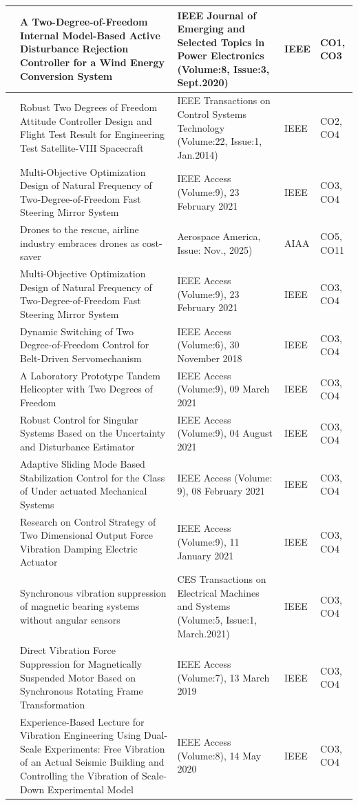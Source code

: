 \documentclass[11pt,paper=a4,answers]{exam}
\begin{document}
\begin{flushleft}
\begin{longtable}{|>{\centering\arraybackslash}p{1.4cm}  |  >{\raggedright\arraybackslash}p{6cm} |>{\centering\arraybackslash}p{3.75cm}|>{\centering\arraybackslash}p{2cm} |>{\centering\arraybackslash}p{2cm} |}
25&A Two-Degree-of-Freedom Internal Model-Based Active Disturbance Rejection Controller for a Wind Energy Conversion System&IEEE Journal of Emerging and Selected Topics in Power Electronics (Volume:8, Issue:3, Sept.2020)&IEEE&CO1, CO3\\\hline
26&Robust Two Degrees of Freedom Attitude Controller Design and Flight Test Result for Engineering Test Satellite-VIII Spacecraft&IEEE Transactions on Control Systems Technology (Volume:22, Issue:1, Jan.2014)&IEEE&CO2, CO4\\\hline
27&Multi-Objective Optimization Design of Natural Frequency of Two-Degree-of-Freedom Fast Steering Mirror System&IEEE Access (Volume:9), 23 February 2021&IEEE&CO3, CO4\\\hline
28&Drones to the rescue, airline industry embraces drones as cost-saver&Aerospace America, Issue: Nov., 2025)& AIAA&CO5, CO11\\\hline
29&Multi-Objective Optimization Design of Natural Frequency of Two-Degree-of-Freedom Fast Steering Mirror System&IEEE Access (Volume:9), 23 February 2021&IEEE&CO3, CO4\\\hline
30&Dynamic Switching of Two Degree-of-Freedom Control for Belt-Driven Servomechanism&IEEE Access (Volume:6), 30 November 2018&IEEE&CO3, CO4\\\hline
31&A Laboratory Prototype Tandem Helicopter with Two Degrees of Freedom&IEEE Access (Volume:9), 09 March 2021&IEEE&CO3, CO4\\\hline
32&Robust Control for Singular Systems Based on the Uncertainty and Disturbance Estimator&IEEE Access (Volume:9), 04 August 2021&IEEE&CO3, CO4\\\hline
33&Adaptive Sliding Mode Based Stabilization Control for the Class of Under actuated Mechanical Systems&IEEE Access (Volume: 9), 08 February 2021&IEEE&CO3, CO4\\\hline
34&Research on Control Strategy of Two Dimensional Output Force Vibration Damping Electric Actuator&IEEE Access (Volume:9), 11 January 2021 &IEEE&CO3, CO4\\\hline
35&Synchronous vibration suppression of magnetic bearing systems without angular sensors&CES Transactions on Electrical Machines and Systems (Volume:5, Issue:1, March.2021)&IEEE&CO3, CO4\\\hline
36&Direct Vibration Force Suppression for Magnetically Suspended Motor Based on Synchronous Rotating Frame Transformation& IEEE Access (Volume:7), 13 March 2019&IEEE&CO3, CO4\\\hline
37&Experience-Based Lecture for Vibration Engineering Using Dual-Scale Experiments: Free Vibration of an Actual Seismic Building and Controlling the Vibration of Scale-Down Experimental Model&IEEE Access (Volume:8),  14 May 2020 &IEEE&CO3, CO4\\\hline

\end{longtable}
\end{flushleft}
\end{document}
